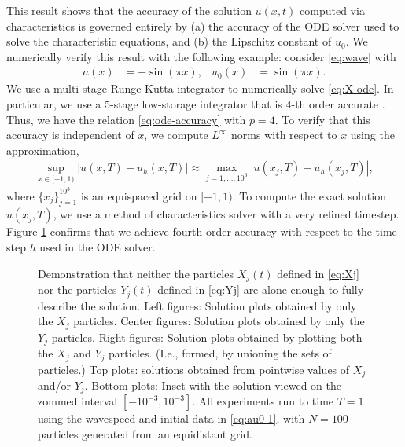 \documentclass[11pt]{amsart}
\begin{document}
  This result shows that the accuracy of the solution $u(x,t)$ computed via characteristics is governed entirely by (a) the accuracy of the ODE solver used to solve the characteristic equations, and (b) the Lipschitz constant of $u_0$. We numerically verify this result with the following example: consider \eqref{eq:wave} with 
  \begin{align*}
    a(x) &= -\sin(\pi x), & u_0(x) &= \sin(\pi x).
  \end{align*}
  We use a multi-stage Runge-Kutta integrator to numerically solve \eqref{eq:X-ode}. In particular, we use a 5-stage low-storage integrator that is 4-th order accurate \cite{carpenter-kennedy-lserk}. Thus, we have the relation \eqref{eq:ode-accuracy} with $p = 4$. To verify that this accuracy is independent of $x$, we compute $L^\infty$ norms with respect to $x$ using the approximation,
  \begin{align*}
    \sup_{x \in [-1,1)} | u(x,T) - u_h(x,T) | \approx \max_{j=1, \ldots, 10^3} |u(x_j,T) - u_h(x_j,T)|,
  \end{align*}
  where $\{x_j\}_{j=1}^{10^3}$ is an equispaced grid on $[-1,1)$. To compute the exact solution $u(x_j,T)$, we use a method of characteristics solver with a very refined timestep.  Figure \ref{fig:f2} confirms that we achieve fourth-order accuracy with respect to the time step $h$ used in the ODE solver. 
\begin{figure}
  \caption{Demonstration that neither the particles $X_j(t)$ defined in \eqref{eq:Xj} nor the particles $Y_j(t)$ defined in \eqref{eq:Yj} are alone enough to fully describe the solution. Left figures: Solution plots obtained by only the $X_j$ particles. Center figures: Solution plots obtained by only the $Y_j$ particles. Right figures: Solution plots obtained by plotting both the $X_j$ and $Y_j$ particles. (I.e., formed, by unioning the sets of particles.) Top plots: solutions obtained from pointwise values of $X_j$ and/or $Y_j$. Bottom plots: Inset with the solution viewed on the zommed interval $[-10^{-3}, 10^{-3}]$. All experiments run to time $T = 1$ using the wavespeed and initial data in \eqref{eq:au0-1}, with $N = 100$ particles generated from an equidistant grid.}\label{fig:f2}
\end{figure}



\end{document}
